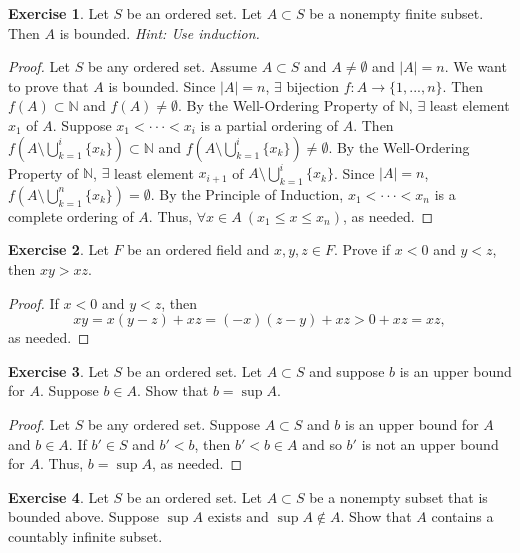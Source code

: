 \documentclass[12pt]{article}
\theoremstyle{definition}
\newtheorem{exercise}{Exercise}
\begin{document}
\thispagestyle{firstpage}

\begin{exercise}
    Let $S$ be an ordered set. Let $A \subset S$ be a nonempty finite subset. Then $A$ is bounded. \textit{Hint: Use induction.}
\end{exercise}

\begin{proof}
    Let $S$ be any ordered set. Assume $A \subset S$ and $A \neq \emptyset$ and $\vert A \vert = n$. We want to prove that $A$ is bounded. Since $\vert A \vert = n$, $\exists$ bijection $f: A \to \{1,...,n\}$. Then $f(A) \subset \mathbb{N}$ and $f(A) \neq \emptyset$. By the Well-Ordering Property of $\mathbb{N}$, $\exists$ least element $x_1$ of $A$. Suppose $x_1 < \cdot \cdot \cdot < x_i$ is a partial ordering of $A$. Then $f(A \setminus \bigcup_{k = 1}^{i}\{x_k\}) \subset \mathbb{N}$ and $f(A \setminus \bigcup_{k = 1}^{i}\{x_k\}) \neq \emptyset$. By the Well-Ordering Property of $\mathbb{N}$, $\exists$ least element $x_{i+1}$ of $A \setminus \bigcup_{k = 1}^{i}\{x_k\}$. Since $\vert A \vert = n$, $f(A \setminus \bigcup_{k = 1}^{n}\{x_k\}) = \emptyset$. By the Principle of Induction, $x_1 < \cdot \cdot \cdot < x_n$ is a complete ordering of $A$. Thus, $\forall x \in A \ (x_1 \leq x \leq x_n)$, as needed.
\end{proof}

\begin{exercise}
    Let $F$ be an ordered field and $x,y,z \in F$. Prove if $x < 0$ and $y < z$, then $xy > xz$.
\end{exercise}

\begin{proof}
    If $x < 0$ and $y < z$, then
    \[
        xy = x(y - z) + xz = (-x)(z - y) + xz > 0 + xz = xz,
    \]
    as needed.
\end{proof}

\begin{exercise}
    Let $S$ be an ordered set. Let $A \subset S$ and suppose $b$ is an upper bound for $A$. Suppose $b \in A$. Show that $b = \sup A$.
\end{exercise}

\begin{proof}
    Let $S$ be any ordered set. Suppose $A \subset S$ and $b$ is an upper bound for $A$ and $b \in A$. If $b' \in S$ and $b' < b$, then $b' < b \in A$ and so $b'$ is not an upper bound for $A$. Thus, $b = \sup A$, as needed.
\end{proof}

\begin{exercise}
    Let $S$ be an ordered set. Let $A \subset S$ be a nonempty subset that is bounded above. Suppose $\sup A$ exists and $\sup A \notin A$. Show that $A$ contains a countably infinite subset.
\end{exercise}
\end{document}
